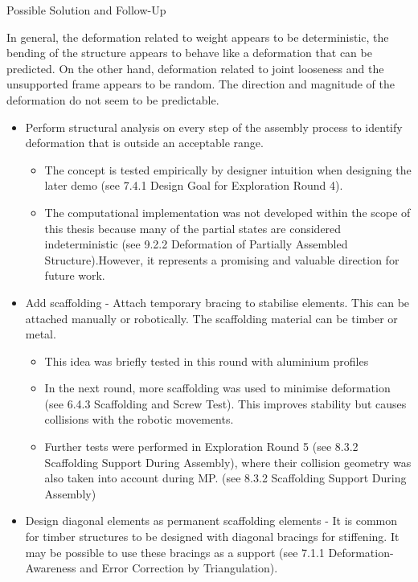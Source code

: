 Possible Solution and Follow-Up

In general, the deformation related to weight appears to be deterministic, the bending of the structure appears to behave like a deformation that can be predicted. On the other hand, deformation related to joint looseness and the unsupported frame appears to be random. The direction and magnitude of the deformation do not seem to be predictable.
\begin{itemize}
    \item Perform structural analysis on every step of the assembly process to identify deformation that is outside an acceptable range.
    \begin{itemize}
        \item The concept is tested empirically by designer intuition when designing the later demo (see 7.4.1 Design Goal for Exploration Round 4).
        \item The computational implementation was not developed within the scope of this thesis because many of the partial states are considered indeterministic (see 9.2.2 Deformation of Partially Assembled Structure).However, it represents a promising and valuable direction for future work.
    \end{itemize}
    \item Add scaffolding - Attach temporary bracing to stabilise elements. This can be attached manually or robotically. The scaffolding material can be timber or metal. 
    \begin{itemize}
        \item This idea was briefly tested in this round with aluminium profiles
        \item In the next round, more scaffolding was used to minimise deformation (see 6.4.3 Scaffolding and Screw Test). This improves stability but causes collisions with the robotic movements. 
        \item Further tests were performed in Exploration Round 5 (see 8.3.2 Scaffolding Support During Assembly), where their collision geometry was also taken into account during MP. (see 8.3.2 Scaffolding Support During Assembly)
    \end{itemize}
    \item Design diagonal elements as permanent scaffolding elements - It is common for timber structures to be designed with diagonal bracings for stiffening. It may be possible to use these bracings as a support (see 7.1.1 Deformation-Awareness and Error Correction by Triangulation).
    \begin{itemize}

\end{itemize}
\end{itemize}
